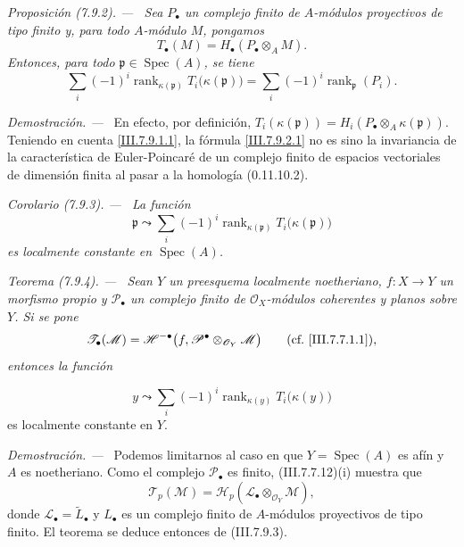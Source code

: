 \documentclass[10pt,oneside]{book}
\newcommand{\kres}{\kappa}
\newcommand{\Spec}{\operatorname{Spec}}
\newcommand{\sref}[2][]{\textup{(#2)}}
\newcommand{\oldpage}[2][]{\setcounter{footnote}{0}\marginpar{\scriptsize\textbf{#1}~|~#2}\ignorespaces}
\newenvironment{theorem}[1][]{\par\medskip\noindent\itshape Teorema (#1). ---\ }{\par}
\newenvironment{proposition}[1][]{\par\medskip\noindent\itshape Proposición (#1). ---\ }{\par}
\newenvironment{corollary}[1][]{\par\medskip\noindent\itshape Corolario (#1). ---\ }{\par}
\newenvironment{proof}{\par\medskip\noindent\textit{Demostración. ---\ }}{\par}
\providecommand{\setmin}{-}%
\begin{document}
\begin{proposition}[7.9.2]
\label{III.7.9.2}
Sea $P_\bullet$ un complejo finito de $A$-módulos proyectivos de
tipo finito y, para todo $A$-módulo $M$, pongamos
\[
  T_\bullet(M)=H_\bullet(P_\bullet\otimes_A M).
\]
Entonces, para todo $\mathfrak p\in\Spec(A)$, se tiene
\[
  \sum_i(\setmin 1)^i
    \operatorname{rank}_{\kres(\mathfrak p)}
      T_i\bigl(\kres(\mathfrak p)\bigr)
  =
  \sum_i(\setmin 1)^i\operatorname{rank}_{\mathfrak p}(P_i).
  \tag{7.9.2.1}\label{III.7.9.2.1}
\]
\end{proposition}

\begin{proof}
En efecto, por definición,
$T_i(\kres(\mathfrak p))
 =H_i(P_\bullet\otimes_A\kres(\mathfrak p))$.
Teniendo en cuenta \eqref{III.7.9.1.1}, la fórmula
\eqref{III.7.9.2.1} no es sino la invariancia de la característica
de Euler-Poincaré de un complejo finito de espacios vectoriales de
dimensión finita al pasar a la homología
\sref[0]{0.11.10.2}.
\end{proof}

\begin{corollary}[7.9.3]
\label{III.7.9.3}
La función
\[
  \mathfrak p\leadsto
  \sum_i(-1)^i
    \operatorname{rank}_{\kres(\mathfrak p)}
      T_i\bigl(\kres(\mathfrak p)\bigr)
\]
es localmente constante en $\Spec(A)$.
\end{corollary}

\begin{theorem}[7.9.4]
\label{III.7.9.4}
Sean $Y$ un preesquema localmente noetheriano,
$f:X\to Y$ un morfismo propio y $\mathscr P_\bullet$ un complejo
finito de $\mathscr O_X$-módulos coherentes y planos sobre $Y$.
Si se pone
\[
  \mathscr T_\bullet(\mathscr M)
  =
  \mathscr H^{-\bullet}
    \bigl(f,\mathscr P^\bullet
      \otimes_{\mathscr O_Y}\mathscr M\bigr)
  \qquad\text{\textup{(cf.~\eqref{III.7.7.1.1})}},
\]
entonces la función

\oldpage[III]{209}
\[
  y\leadsto
  \sum_i(\setmin 1)^i
    \operatorname{rank}_{\kres(y)}
      T_i\bigl(\kres(y)\bigr)
  \tag{7.9.4.1}\label{III.7.9.4.1}
\]
es localmente constante en $Y$.
\end{theorem}

\begin{proof}
Podemos limitarnos al caso en que $Y=\Spec(A)$ es afín y $A$ es
noetheriano. Como el complejo $\mathscr P_\bullet$ es finito,
\sref{III.7.7.12}{(i)} muestra que
\[
  \mathscr T_p(\mathscr M)
  =
  \mathscr H_p(\mathscr L_\bullet
    \otimes_{\mathscr O_Y}\mathscr M),
\]
donde $\mathscr L_\bullet=\widetilde{L}_\bullet$ y
$L_\bullet$ es un complejo finito de $A$-módulos proyectivos de
tipo finito. El teorema se deduce entonces de
\sref{III.7.9.3}.
\end{proof}
\end{document}
